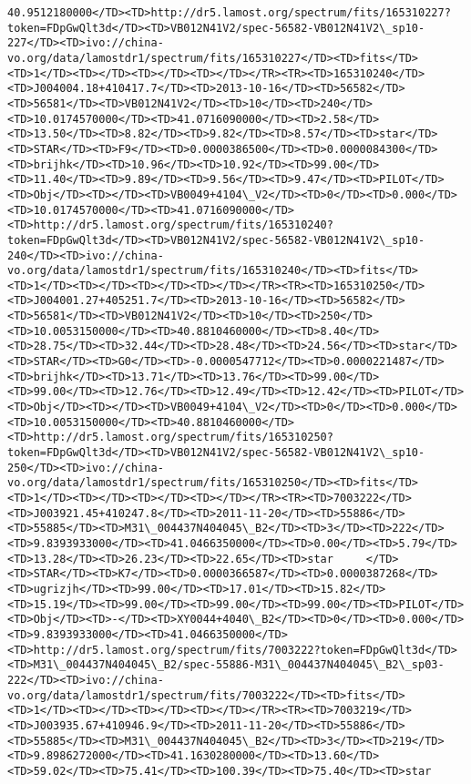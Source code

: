 \documentclass[11pt]{article}
\begin{document}
\begin{Verbatim}[commandchars=\\\{\}]
40.9512180000</TD><TD>http://dr5.lamost.org/spectrum/fits/165310227?token=FDpGwQlt3d</TD><TD>VB012N41V2/spec-56582-VB012N41V2\_sp10-227</TD><TD>ivo://china-vo.org/data/lamostdr1/spectrum/fits/165310227</TD><TD>fits</TD><TD>1</TD><TD></TD><TD></TD><TD></TD></TR><TR><TD>165310240</TD><TD>J004004.18+410417.7</TD><TD>2013-10-16</TD><TD>56582</TD><TD>56581</TD><TD>VB012N41V2</TD><TD>10</TD><TD>240</TD><TD>10.0174570000</TD><TD>41.0716090000</TD><TD>2.58</TD><TD>13.50</TD><TD>8.82</TD><TD>9.82</TD><TD>8.57</TD><TD>star</TD><TD>STAR</TD><TD>F9</TD><TD>0.0000386500</TD><TD>0.0000084300</TD><TD>brijhk</TD><TD>10.96</TD><TD>10.92</TD><TD>99.00</TD><TD>11.40</TD><TD>9.89</TD><TD>9.56</TD><TD>9.47</TD><TD>PILOT</TD><TD>Obj</TD><TD></TD><TD>VB0049+4104\_V2</TD><TD>0</TD><TD>0.000</TD><TD>10.0174570000</TD><TD>41.0716090000</TD><TD>http://dr5.lamost.org/spectrum/fits/165310240?token=FDpGwQlt3d</TD><TD>VB012N41V2/spec-56582-VB012N41V2\_sp10-240</TD><TD>ivo://china-vo.org/data/lamostdr1/spectrum/fits/165310240</TD><TD>fits</TD><TD>1</TD><TD></TD><TD></TD><TD></TD></TR><TR><TD>165310250</TD><TD>J004001.27+405251.7</TD><TD>2013-10-16</TD><TD>56582</TD><TD>56581</TD><TD>VB012N41V2</TD><TD>10</TD><TD>250</TD><TD>10.0053150000</TD><TD>40.8810460000</TD><TD>8.40</TD><TD>28.75</TD><TD>32.44</TD><TD>28.48</TD><TD>24.56</TD><TD>star</TD><TD>STAR</TD><TD>G0</TD><TD>-0.0000547712</TD><TD>0.0000221487</TD><TD>brijhk</TD><TD>13.71</TD><TD>13.76</TD><TD>99.00</TD><TD>99.00</TD><TD>12.76</TD><TD>12.49</TD><TD>12.42</TD><TD>PILOT</TD><TD>Obj</TD><TD></TD><TD>VB0049+4104\_V2</TD><TD>0</TD><TD>0.000</TD><TD>10.0053150000</TD><TD>40.8810460000</TD><TD>http://dr5.lamost.org/spectrum/fits/165310250?token=FDpGwQlt3d</TD><TD>VB012N41V2/spec-56582-VB012N41V2\_sp10-250</TD><TD>ivo://china-vo.org/data/lamostdr1/spectrum/fits/165310250</TD><TD>fits</TD><TD>1</TD><TD></TD><TD></TD><TD></TD></TR><TR><TD>7003222</TD><TD>J003921.45+410247.8</TD><TD>2011-11-20</TD><TD>55886</TD><TD>55885</TD><TD>M31\_004437N404045\_B2</TD><TD>3</TD><TD>222</TD><TD>9.8393933000</TD><TD>41.0466350000</TD><TD>0.00</TD><TD>5.79</TD><TD>13.28</TD><TD>26.23</TD><TD>22.65</TD><TD>star     </TD><TD>STAR</TD><TD>K7</TD><TD>0.0000366587</TD><TD>0.0000387268</TD><TD>ugrizjh</TD><TD>99.00</TD><TD>17.01</TD><TD>15.82</TD><TD>15.19</TD><TD>99.00</TD><TD>99.00</TD><TD>99.00</TD><TD>PILOT</TD><TD>Obj</TD><TD>-</TD><TD>XY0044+4040\_B2</TD><TD>0</TD><TD>0.000</TD><TD>9.8393933000</TD><TD>41.0466350000</TD><TD>http://dr5.lamost.org/spectrum/fits/7003222?token=FDpGwQlt3d</TD><TD>M31\_004437N404045\_B2/spec-55886-M31\_004437N404045\_B2\_sp03-222</TD><TD>ivo://china-vo.org/data/lamostdr1/spectrum/fits/7003222</TD><TD>fits</TD><TD>1</TD><TD></TD><TD></TD><TD></TD></TR><TR><TD>7003219</TD><TD>J003935.67+410946.9</TD><TD>2011-11-20</TD><TD>55886</TD><TD>55885</TD><TD>M31\_004437N404045\_B2</TD><TD>3</TD><TD>219</TD><TD>9.8986272000</TD><TD>41.1630280000</TD><TD>13.60</TD><TD>59.02</TD><TD>75.41</TD><TD>100.39</TD><TD>75.40</TD><TD>star     
\end{Verbatim}
\end{document}
